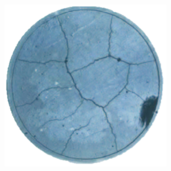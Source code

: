 \begin{frame}
\begin{columns}[T]
\begin{column}{0.6\textwidth}
\begin{figure}
\begin{subfigure}{0.32\textwidth}
          \includegraphics[width=0.8\textwidth]{Chapter345/figures/16mm_exp.png}
        \end{subfigure}
        

\end{figure}
\end{column}
\end{columns}
\end{frame}
